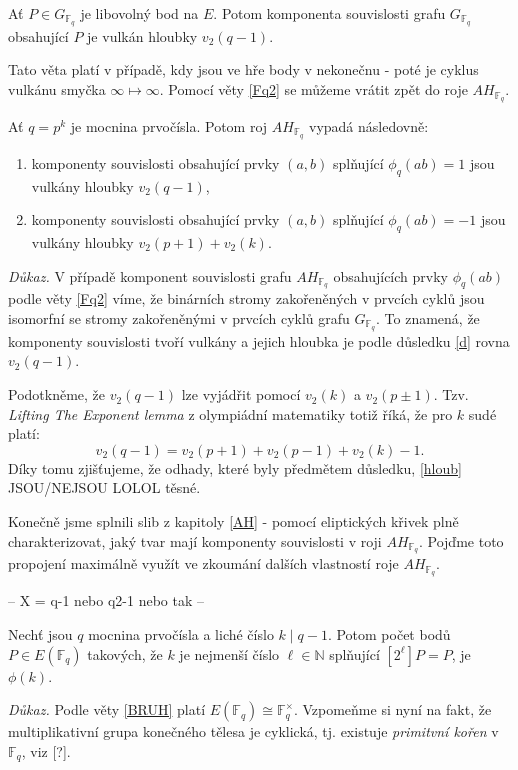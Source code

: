 \documentclass[12pt]{report}
\begin{document}
\begin{dusledek}\label{d}
Ať $P \in G_{\mathbb{F}_q}$ je libovolný bod na $E$. Potom komponenta souvislosti grafu $G_{\mathbb{F}_q}$ obsahující $P$ je vulkán hloubky $v_2(q-1)$.
\end{dusledek}

Tato věta platí v případě, kdy jsou ve hře body v nekonečnu - poté je cyklus vulkánu smyčka $\infty \longmapsto \infty$. Pomocí věty \ref{Fq2} se můžeme vrátit zpět do roje $AH_{\mathbb{F}_q}$.

\begin{veta}
Ať $q = p^k$ je mocnina prvočísla. Potom roj $AH_{\mathbb{F}_q}$ vypadá následovně:
\begin{enumerate}
\item komponenty souvislosti obsahující prvky $(a,b)$ splňující $\phi_q (ab) = 1$ jsou vulkány hloubky $v_2(q-1)$,
\item komponenty souvislosti obsahující prvky $(a,b)$ splňující $\phi_q (ab) = -1$ jsou vulkány hloubky $v_2 (p+1) + v_2(k)$.
\end{enumerate} 
\end{veta}

\noindent \textit{Důkaz.} V případě komponent souvislosti grafu $AH_{\mathbb{F}_q}$ obsahujících prvky $\phi_q(ab)$ podle věty \ref{Fq2} víme, že binárních stromy zakořeněných v prvcích cyklů jsou isomorfní se stromy zakořeněnými v prvcích cyklů grafu $G_{\mathbb{F}_q}$. To znamená, že komponenty souvislosti tvoří vulkány a jejich hloubka je podle důsledku \ref{d} rovna $v_2 (q-1)$. 

\begin{poznamka}
Podotkněme, že $v_2 (q-1)$ lze vyjádřit pomocí $v_2(k)$ a $v_2(p \pm 1)$. Tzv.  \textit{Lifting The Exponent lemma} z olympiádní matematiky totiž říká, že pro $k$ sudé platí: $$v_2(q-1) = v_2(p+1)+v_2(p-1)+v_2(k)-1.$$ Díky tomu zjišťujeme, že odhady, které byly předmětem důsledku, \ref{hloub} JSOU/NEJSOU LOLOL těsné.
\end{poznamka}


Konečně jsme splnili slib z kapitoly \ref{AH} - pomocí eliptických křivek plně charakterizovat, jaký tvar mají komponenty souvislosti v roji $AH_{\mathbb{F}_q}$. Pojďme toto propojení maximálně využít ve zkoumání dalších vlastností roje $AH_{\mathbb{F}_q}$.

--
X = q-1 nebo q2-1 nebo tak
--
\begin{lemma}\label{phi}
Nechť jsou $q$ mocnina prvočísla a liché číslo $k \mid q-1$. Potom počet bodů $P \in E(\mathbb{F}_q)$ takových, že $k$ je nejmenší číslo $\ell \in \mathbb{N}$ splňující $[2^{\ell}]P = P$, je $\phi(k)$.
\end{lemma}
\noindent \textit{Důkaz.} Podle věty \ref{BRUH} platí $E(\mathbb{F}_q) \cong \mathbb{F}_q ^{\times}$. Vzpomeňme si nyní na fakt, že multiplikativní grupa konečného tělesa je cyklická, tj. existuje \textit{primitvní kořen} v $\mathbb{F}_q$, viz [?].  
\end{document}
